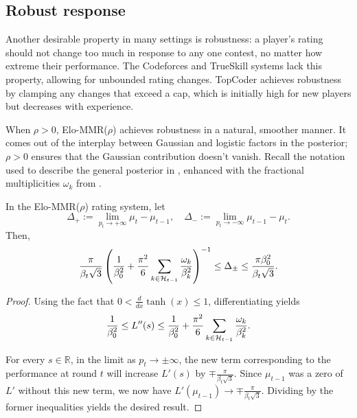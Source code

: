 \subsection{Robust response}
\label{sec:robust}

Another desirable property in many settings is robustness: a player's rating should not change too much in response to any one contest, no matter how extreme their performance. The Codeforces and TrueSkill systems lack this property, allowing for unbounded rating changes. TopCoder achieves robustness by clamping any changes that exceed a cap, which is initially high for new players but decreases with experience.

When $\rho>0$, Elo-MMR($\rho$) achieves robustness in a natural, smoother manner. It comes out of the interplay between Gaussian and logistic factors in the posterior; $\rho>0$ ensures that the Gaussian contribution doesn't vanish. Recall the notation used to describe the general posterior in , enhanced with the fractional multiplicities $\omega_k$ from .

\begin{theorem}
\label{thm:robust}
In the Elo-MMR($\rho$) rating system, let
\[\Delta_{+} := \lim_{p_{t}\rightarrow+\infty} \mu_{t}-\mu_{t-1}, \quad \Delta_{-} := \lim_{p_{t}\rightarrow-\infty}\mu_{t-1}-\mu_{t}.
\]
Then,
\[\frac{\pi}{\beta_t\sqrt 3}
\left(\frac{1}{\beta_0^2} + \frac{\pi^2}{6}\sum_{k\in{\mathcal{H}}_{t-1}}\frac{\omega_k}{\beta_k^2} \right)^{-1}
\le \Delta_{\pm} \le \frac{\pi\beta_0^2}{\beta_t\sqrt 3}.\]
\end{theorem}

\begin{proof}
Using the fact that $0 < \frac{d}{dx}\tanh(x) \le 1$, differentiating  yields
\[\frac{1}{\beta_0^2} \le L''(s)
\le \frac{1}{\beta_0^2} + \frac{\pi^2}{6}\sum_{k\in{\mathcal{H}}_{t-1}}\frac{\omega_k}{\beta_k^2}.\]

For every $s\in\mathbb R$, in the limit as $p_t\rightarrow\pm\infty$, the new term corresponding to the performance at round $t$ will increase $L'(s)$ by $\mp\frac{\pi}{\beta_t\sqrt 3}$. Since $\mu_{t-1}$ was a zero of $L'$ without this new term, we now have
$L'(\mu_{t-1}) \rightarrow \mp\frac{\pi}{\beta_t\sqrt 3}.$ Dividing by the former inequalities yields the desired result.
\end{proof}

